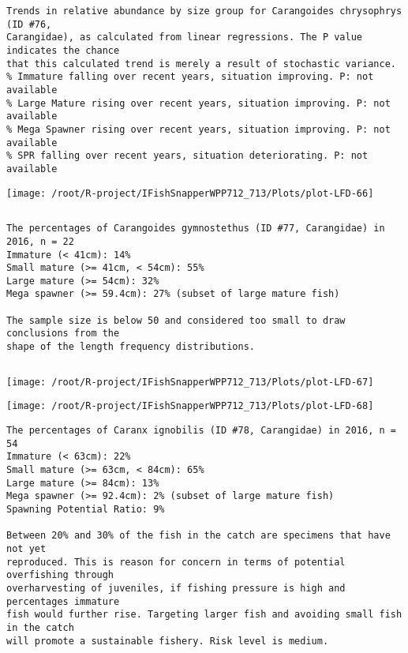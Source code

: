 \documentclass{report}\usepackage[]{graphicx}\usepackage[]{color}
\makeatletter
\def\maxwidth{ %
  \ifdim\Gin@nat@width>\linewidth
    \linewidth
  \else
    \Gin@nat@width
  \fi
}
\newenvironment{kframe}{%
 \def\at@end@of@kframe{}%
 \ifinner\ifhmode%
  \def\at@end@of@kframe{\end{minipage}}%
  \begin{minipage}{\columnwidth}%
 \fi\fi%
 \def\FrameCommand##1{\hskip\@totalleftmargin \hskip-\fboxsep
 \colorbox{shadecolor}{##1}\hskip-\fboxsep
     \hskip-\linewidth \hskip-\@totalleftmargin \hskip\columnwidth}%
 \MakeFramed {\advance\hsize-\width
   \@totalleftmargin\z@ \linewidth\hsize
   \@setminipage}}%
 {\par\unskip\endMakeFramed%
 \at@end@of@kframe}
\newenvironment{knitrout}{}{} %
\makeatother
\begin{document}
\begin{knitrout}
\begin{kframe}
\begin{verbatim}
Trends in relative abundance by size group for Carangoides chrysophrys (ID #76,
Carangidae), as calculated from linear regressions. The P value indicates the chance
that this calculated trend is merely a result of stochastic variance.
% Immature falling over recent years, situation improving. P: not available
% Large Mature rising over recent years, situation improving. P: not available
% Mega Spawner rising over recent years, situation improving. P: not available
% SPR falling over recent years, situation deteriorating. P: not available
\end{verbatim}
\end{kframe}
\texttt{[image: /root/R-project/IFishSnapperWPP712\_713/Plots/plot-LFD-66]} 
\begin{kframe}\begin{verbatim}
\end{verbatim}
\end{kframe}
\clearpage
\newpage
\begin{kframe}\begin{verbatim}
The percentages of Carangoides gymnostethus (ID #77, Carangidae) in 2016, n = 22
Immature (< 41cm): 14%
Small mature (>= 41cm, < 54cm): 55%
Large mature (>= 54cm): 32%
Mega spawner (>= 59.4cm): 27% (subset of large mature fish)
 
The sample size is below 50 and considered too small to draw conclusions from the
shape of the length frequency distributions.
\end{verbatim}
\end{kframe}
\newpage
\begin{kframe}\begin{verbatim}
\end{verbatim}
\end{kframe}
\texttt{[image: /root/R-project/IFishSnapperWPP712\_713/Plots/plot-LFD-67]} 

\texttt{[image: /root/R-project/IFishSnapperWPP712\_713/Plots/plot-LFD-68]} 
\begin{kframe}\begin{verbatim}
The percentages of Caranx ignobilis (ID #78, Carangidae) in 2016, n = 54
Immature (< 63cm): 22%
Small mature (>= 63cm, < 84cm): 65%
Large mature (>= 84cm): 13%
Mega spawner (>= 92.4cm): 2% (subset of large mature fish)
Spawning Potential Ratio: 9%
 
Between 20% and 30% of the fish in the catch are specimens that have not yet
reproduced. This is reason for concern in terms of potential overfishing through
overharvesting of juveniles, if fishing pressure is high and percentages immature
fish would further rise. Targeting larger fish and avoiding small fish in the catch
will promote a sustainable fishery. Risk level is medium.


\end{verbatim}
\end{kframe}
\end{knitrout}
\end{document}
